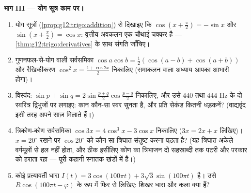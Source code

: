 \begin{problem}
\medskip
\noindent\textbf{भाग III --- योग सूत्र काम पर।}
\begin{enumerate}[resume]
  \item योग सूत्रों (\cref{prop:g12:trigo:addition}) से दिखाइए कि $\cos\left(x + \frac\pi2\right) = -\sin x$ और $\sin\left(x + \frac\pi2\right) = \cos x$: वृत्तीय अवकलन एक
        चौथाई चक्कर है --- \cref{thm:g12:trigo:derivatives} के साथ संगति जाँचिए।
  \item गुणनफल-से-योग वाली सर्वसमिका $\cos a \cos b = \frac12\left(\cos(a - b) +
        \cos(a + b)\right)$ और रैखिकीकरण $\cos^2 x = \frac{1 + \cos 2x}{2}$ निकालिए
        (समाकलन वाला अध्याय आपका आभारी होगा)।
  \item विस्पंद: $\sin p + \sin q = 2 \sin\frac{p + q}{2}
        \cos\frac{p - q}{2}$ निकालिए, और उसे $440$ तथा $444$ Hz के दो स्वरित्र
        द्विभुजों पर लगाइए: कान कौन-सा स्वर सुनता है, और प्रति सेकंड कितनी
        धड़कनें? (वाद्यवृंद इसी तरह अपने साज़ मिलाते हैं।)
  \item त्रिकोण-कोण सर्वसमिका $\cos 3x = 4\cos^3 x - 3\cos x$ निकालिए ($3x = 2x + x$ लिखिए)। $x = 20^\circ$ रखने पर
        $\cos 20^\circ$ को कौन-सा त्रिघात  संतुष्ट करना पड़ता है? (यह त्रिघात
        अकेले वर्गमूलों से हल नहीं होता, और ठीक इसीलिए कोण का त्रिभाजन दो
        सहस्राब्दी तक पटरी और परकार को हराता रहा --- पूरी कहानी स्नातक
        खंडों में है।)
  \item कोई प्रत्यावर्ती धारा $I(t) = 3\cos(100\pi t) + 3\sqrt3 \sin(100\pi t)$ है। उसे $R\cos(100\pi t - \varphi)$ के रूप में फिर से लिखिए:
        शिखर धारा और कला क्या हैं?
\end{enumerate}


\end{problem}
